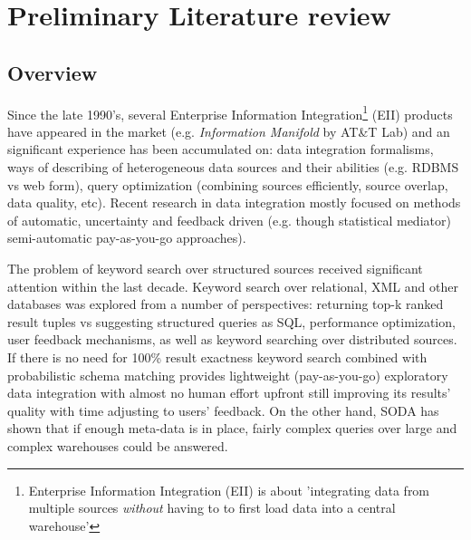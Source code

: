 \section{Preliminary Literature review}


\subsection{Overview}


Since the late 1990's, several Enterprise Information Integration\footnote{%
	Enterprise Information Integration (EII) is about 'integrating data from 
	multiple sources 	\textit{without} having to to first load data into
	 a central warehouse'\cite[p.1]{eii_2005}}
 (EII) products have appeared in the market (e.g. \textit{Information Manifold} by AT\&T Lab) and an significant experience has been accumulated on: data integration formalisms, ways of describing of heterogeneous data sources and their abilities (e.g. RDBMS vs web form), query optimization (combining sources efficiently, source overlap, data quality, etc)\cite{eii_2005}. 
%
Recent research in data integration mostly focused on methods of automatic, uncertainty and feedback  driven (e.g. though statistical mediator) semi-automatic pay-as-you-go approaches\cite[ch.19]{principles_data_integration}).


The problem of keyword search over structured sources received significant attention within the last decade. Keyword search over relational, XML and other databases was explored from a number of perspectives: returning top-k ranked result tuples vs suggesting structured queries as SQL, performance optimization, user feedback mechanisms, as well as keyword searching over distributed sources. 
If there is no need for 100\% result exactness keyword search combined with probabilistic schema matching provides lightweight (pay-as-you-go) exploratory data integration with almost no human effort upfront still improving its results' quality with time adjusting to users' feedback\cite[ch.16]{principles_data_integration}. On the other hand, SODA has shown that if enough meta-data is in place, fairly complex queries over large and complex warehouses could be answered.

